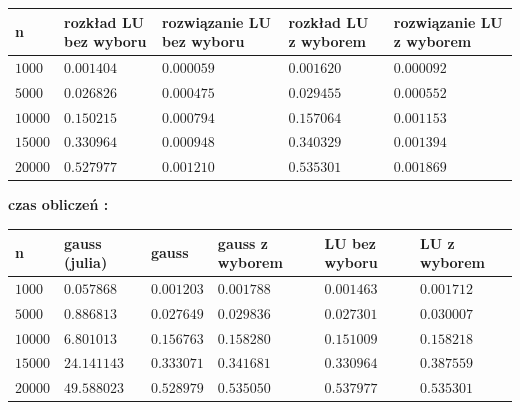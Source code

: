 \documentclass{article}
\begin{document}
\begin{center}
	\begin{tabular}{|p{1cm}|p{3cm}|p{3cm}|p{3cm}|p{3cm}|}
		\hline
		\textbf{n} & \textbf{rozkład LU  bez wyboru} & \textbf{rozwiązanie LU bez wyboru} & \textbf{rozkład LU  z wyborem} & \textbf{rozwiązanie LU z wyborem}  \\
		\hline
		$1000$  & $0.001404$  & $0.000059$  & $0.001620$  & $ 0.000092$  \\
		\hline
		$5000$ & $0.026826$  & $0.000475$  & $0.029455$  & $0.000552$  \\
		\hline
		$10000$ & $0.150215$  & $0.000794$  & $0.157064$  & $ 0.001153$   \\
		\hline
		$15000$ & $0.330964$  & $0.000948$  & $0.340329$  & $0.001394$   \\
		\hline
		$20000$ & $0.527977$  & $0.001210$  & $0.535301$  & $0.001869$  \\
		\hline
	\end{tabular}
\end{center}
\vspace{0.5cm}
\noindent \textbf{czas obliczeń :}
\begin{center}
	\begin{tabular}{|p{1cm}|p{3cm}|p{3cm}|p{3cm}|p{3cm}|p{3cm}|}
		\hline
		\textbf{n} & \textbf{gauss (julia)} & \textbf{gauss} & \textbf{gauss z wyborem} & \textbf{LU bez wyboru} & \textbf{LU z wyborem}  \\
		\hline
		$1000$ & $0.057868$ & $0.001203$ & $0.001788$ & $0.001463$ & $0.001712$ \\
		\hline
		$5000$ & $0.886813$ & $0.027649$ & $0.029836 $ & $0.027301$ & $0.030007$ \\
		\hline
		$10000$ & $6.801013$ & $0.156763$ & $0.158280$ & $0.151009$ & $0.158218$  \\
		\hline
		$15000$ & $24.141143$ & $0.333071$ & $0.341681$ & $0.330964$ & $0.387559$  \\
		\hline
		$20000$ & $49.588023$ & $0.528979$ & $0.535050$ & $ 0.537977$ & $0.535301$ \\
		\hline
	\end{tabular}
\end{center}
\vspace{-0.3cm}
\end{document}
